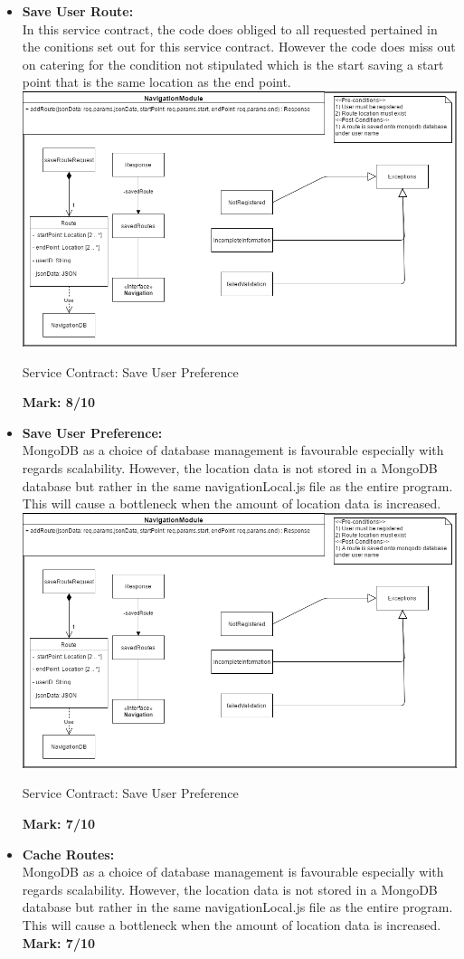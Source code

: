 \begin{itemize}
	
\item \textbf{Save User Route:}\\In this service contract, the code does obliged to all requested pertained in the conitions set out for this service contract. However the code does miss out on catering for the condition not stipulated which is the start saving a start point that is the same location as the end point.\\
\includegraphics[scale=0.5]{SaveRoute.png}
\caption{Service Contract: Save User Preference}
	\textbf{Mark: 8/10}
\item \textbf{Save User Preference:}\\MongoDB as a choice of database management is favourable especially with regards scalability. However, the location data is not stored in a MongoDB database but rather in the same navigationLocal.js file as the entire program. This will cause a bottleneck when the amount of location data is increased.\\
\includegraphics[scale=0.5]{SaveRoute.png}
\caption{Service Contract: Save User Preference}
	\textbf{Mark: 7/10}
\item \textbf{Cache Routes:}\\MongoDB as a choice of database management is favourable especially with regards scalability. However, the location data is not stored in a MongoDB database but rather in the same navigationLocal.js file as the entire program. This will cause a bottleneck when the amount of location data is increased.\\
	\textbf{Mark: 7/10}
	
\end{itemize}